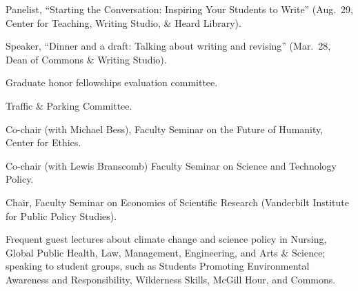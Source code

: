 \item[2013] Panelist, ``Starting the Conversation: Inspiring Your Students to
  Write'' (Aug.~29, Center for Teaching, Writing Studio, \& Heard Library).
\item[2013] Speaker, ``Dinner and a draft: Talking about writing and revising''
  (Mar.~28, Dean of Commons \& Writing Studio).
\item[2013] Graduate honor fellowships evaluation committee.
\item[2010--2013] Traffic \& Parking Committee.
\item[2008] Co-chair (with Michael Bess), Faculty Seminar on the Future of
  Humanity, Center for Ethics.
\item[1999--2000] Co-chair (with Lewis Branscomb) Faculty Seminar on Science
  and Technology Policy.
\item[1996--1997] Chair, Faculty Seminar on Economics of Scientific Research
  (Vanderbilt Institute for Public Policy Studies).
\item[Ongoing] Frequent guest lectures about climate change and science policy
  in Nursing, Global Public Health, Law, Management, Engineering, and Arts \&
  Science; speaking to student groups, such as Students Promoting Environmental
  Awareness and Responsibility, Wilderness Skills, McGill Hour, and Commons.

